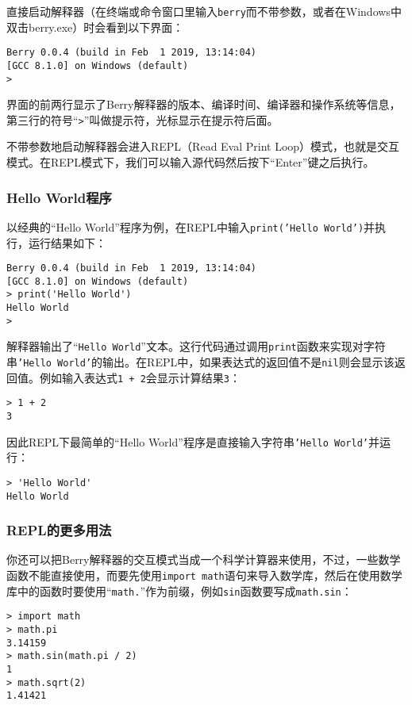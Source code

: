 直接启动解释器（在终端或命令窗口里输入\texttt{berry}而不带参数，或者在Windows中双击berry.exe）时会看到以下界面：
\begin{lstlisting}[language=berry, numbers=none]
Berry 0.0.4 (build in Feb  1 2019, 13:14:04)
[GCC 8.1.0] on Windows (default)
>
\end{lstlisting}
界面的前两行显示了Berry解释器的版本、编译时间、编译器和操作系统等信息，第三行的符号``\texttt{>}''叫做提示符，光标显示在提示符后面。

不带参数地启动解释器会进入REPL（Read Eval Print Loop）模式，也就是交互模式。在REPL模式下，我们可以输入源代码然后按下``Enter''键之后执行。

\subsubsection{Hello World程序}

以经典的``Hello World''程序为例，在REPL中输入\texttt{print('Hello World')}并执行，运行结果如下：
\begin{lstlisting}[language=berry, numbers=none]
Berry 0.0.4 (build in Feb  1 2019, 13:14:04)
[GCC 8.1.0] on Windows (default)
> print('Hello World')
Hello World
>
\end{lstlisting}
解释器输出了``\texttt{Hello World}''文本。这行代码通过调用\texttt{print}函数来实现对字符串\texttt{'Hello World'}的输出。在REPL中，如果表达式的返回值不是\texttt{nil}则会显示该返回值。例如输入表达式\texttt{1 + 2}会显示计算结果\texttt{3}：
\begin{lstlisting}[language=berry, numbers=none]
> 1 + 2
3
\end{lstlisting}

因此REPL下最简单的``Hello World''程序是直接输入字符串\texttt{'Hello World'}并运行：
\begin{lstlisting}[language=berry, numbers=none]
> 'Hello World'
Hello World
\end{lstlisting}

\subsubsection{REPL的更多用法}

你还可以把Berry解释器的交互模式当成一个科学计算器来使用，不过，一些数学函数不能直接使用，而要先使用\texttt{import math}语句来导入数学库，然后在使用数学库中的函数时要使用``\texttt{math.}''作为前缀，例如\texttt{sin}函数要写成\texttt{math.sin}：
\begin{lstlisting}[language=berry, numbers=none]
> import math
> math.pi
3.14159
> math.sin(math.pi / 2)
1
> math.sqrt(2)
1.41421
\end{lstlisting}

